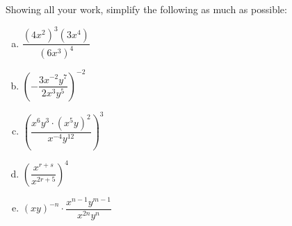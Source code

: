 \documentclass[11pt,letterpaper]{article}
\begin{document}
\newpage



 Showing all your work, simplify the following as much as possible:
	\begin{enumerate}[(a)]
	\item $\dfrac{(4x^2)^3 (3x^4)}{(6x^3)^4}$
	\item $\left( - \dfrac{3x^{-2} y^7}{2x^3 y^5} \right)^{-2}$
	\item $\left( \dfrac{x^6 y^3 \cdot (x^5y)^2}{x^{-4} y^{12}} \right)^3$
	\item $\left( \dfrac{x^{r + s}}{x^{2r + 5}} \right)^4$
	\item $(xy)^{-n} \cdot \dfrac{x^{n - 1} y^{m - 1}}{x^{2n} y^n}$
	\end{enumerate}
\end{document}
